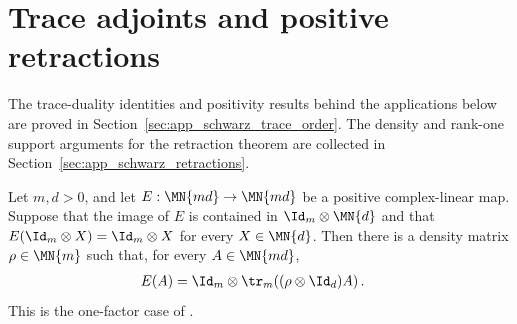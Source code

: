 \section{Trace adjoints and positive retractions}

The trace-duality identities and positivity results behind the applications
below are proved in Section~\ref{sec:app_schwarz_trace_order}. The density and
rank-one support arguments for the retraction theorem are collected in
Section~\ref{sec:app_schwarz_retractions}.

\begin{theorem}
    \label{thm:positive_retraction_one_matrix_factor}
    \leanok
    Let $m,d>0$, and let
    $E:\MN{md}\to\MN{md}$ be a positive complex-linear map. Suppose that the
    image of $E$ is contained in $\Id_m\otimes\MN{d}$ and that
    $E(\Id_m\otimes X)=\Id_m\otimes X$ for every $X\in\MN{d}$. Then there is
    a density matrix $\rho\in\MN{m}$ such that, for every $A\in\MN{md}$,
    \begin{align}
        E(A)
         & =\Id_m\otimes
        \tr_m\!\left((\rho\otimes\Id_d)A\right).
        \label{eq:schwarz_positive_retraction_factor}
    \end{align}
    This is the one-factor case of
    \cite[Proposition~1.5 and Equation~(1.40)]{Wolf2012Quantum}.
\end{theorem}

